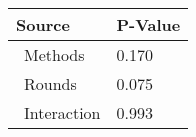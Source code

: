 
\centering
\begin{tabular}{ll}
\toprule
          Source & P-Value \\
\midrule
    \    Methods &   0.170 \\
     \    Rounds &   0.075 \\
\    Interaction &   0.993 \\
\bottomrule
\end{tabular}

